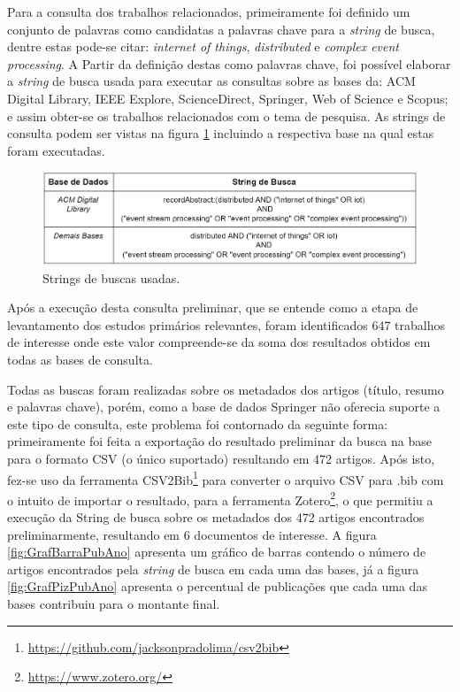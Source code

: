 \documentclass[ti,table]{texufpel} %
\begin{document}
  

Para a consulta dos trabalhos relacionados, primeiramente foi definido um conjunto de palavras como candidatas a palavras chave para a \textit{string} de busca, dentre estas pode-se citar: \textit{internet of things}, \textit{distributed} e \textit{complex event processing}. A Partir da definição destas como palavras chave, foi possível elaborar a \textit{string} de busca usada para executar as consultas sobre as bases da: ACM Digital Library, IEEE Explore, ScienceDirect, Springer, Web of Science e Scopus; e assim obter-se os trabalhos relacionados com o tema de pesquisa. As strings de consulta podem ser vistas na figura \ref{tab:stringBusca} incluindo a respectiva base na qual estas foram executadas. 

  

  

  

\begin{figure}[ht] 

    \centering 

    \includegraphics[width=1\textwidth]{imagens/tabela_string_busca.png} 

    \caption{Strings de buscas usadas.} 

    \label{tab:stringBusca} 

\end{figure} 

  

Após a execução desta consulta preliminar, que se entende como a etapa de levantamento dos estudos primários relevantes, foram identificados 647 trabalhos de interesse onde este valor compreende-se da soma dos resultados obtidos em todas as bases de consulta. 

  

Todas as buscas foram realizadas sobre os metadados dos artigos (título, resumo e palavras chave), porém, como a base de dados Springer não oferecia suporte a este tipo de consulta, este problema foi contornado da seguinte forma: primeiramente foi feita a exportação do resultado preliminar da busca na base para o formato CSV (o único suportado) resultando em 472 artigos. Após isto, fez-se uso da ferramenta CSV2Bib\footnote{\url{https://github.com/jacksonpradolima/csv2bib}} para converter o arquivo CSV para .bib com o intuito de importar o resultado, para a ferramenta Zotero\footnote{\url{https://www.zotero.org/}}, o que permitiu a execução da String de busca sobre os metadados dos 472 artigos encontrados preliminarmente, resultando em 6 documentos de interesse. A figura  \ref{fig:GrafBarraPubAno} apresenta um gráfico de barras contendo o número de artigos encontrados pela \textit{string} de busca em cada uma das bases, já a figura \ref{fig:GrafPizPubAno} apresenta o percentual de publicações que cada uma das bases contribuiu para o montante final. 
\end{document}
